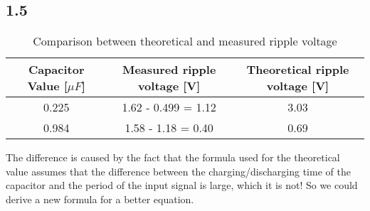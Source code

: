     

\subsection*{1.5}
    
   \begin{table}[htbp]
     \centering
     \caption{Comparison between theoretical and measured ripple voltage}
       \begin{tabular}{c|c|c}
       Capacitor Value [$\mu F$] & Measured ripple voltage [V] & Theoretical ripple voltage [V] \\
       \hline
       0.225         &     1.62 - 0.499 = 1.12        & 3.03 \\
       0.984         &     1.58 - 1.18 = 0.40         & 0.69 \\       
       \end{tabular}%
     \label{tab:addlabel}%
   \end{table}%

The difference is caused by the fact that the formula used for the theoretical value assumes that the difference between the charging/discharging time of the capacitor and the period of the input signal is large, which it is not! So we could derive a new formula for a better equation.

    



